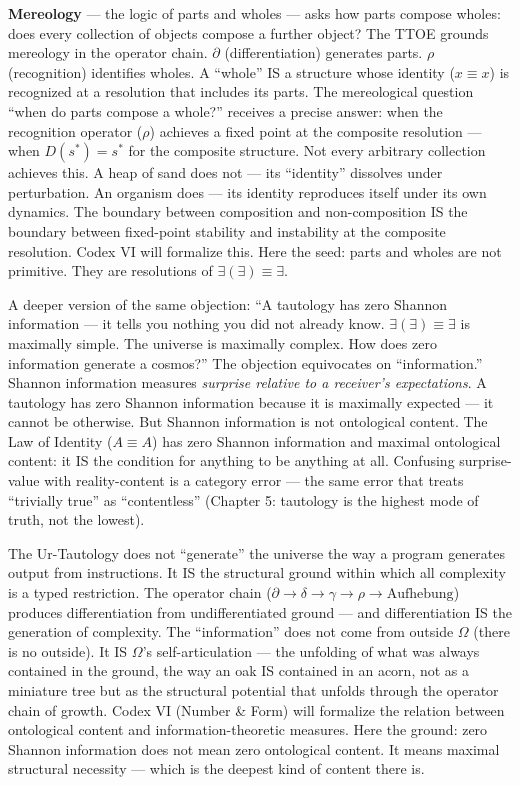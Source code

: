 \documentclass[10pt, openany, oneside]{book}
\begin{document}
\textbf{Mereology} --- the logic of parts and wholes --- asks how parts compose wholes: does every collection of objects compose a further object? The TTOE grounds mereology in the operator chain. $\partial$ (differentiation) generates parts. $\rho$ (recognition) identifies wholes. A ``whole'' IS a structure whose identity ($x \equiv x$) is recognized at a resolution that includes its parts. The mereological question ``when do parts compose a whole?'' receives a precise answer: when the recognition operator ($\rho$) achieves a fixed point at the composite resolution --- when $D(s^*) = s^*$ for the composite structure. Not every arbitrary collection achieves this. A heap of sand does not --- its ``identity'' dissolves under perturbation. An organism does --- its identity reproduces itself under its own dynamics. The boundary between composition and non-composition IS the boundary between fixed-point stability and instability at the composite resolution. Codex VI will formalize this. Here the seed: parts and wholes are not primitive. They are resolutions of $\exists(\exists) \equiv \exists$.

A deeper version of the same objection: ``A tautology has zero Shannon information --- it tells you nothing you did not already know. $\exists(\exists) \equiv \exists$ is maximally simple. The universe is maximally complex. How does zero information generate a cosmos?'' The objection equivocates on ``information.'' Shannon information measures \textit{surprise relative to a receiver's expectations}. A tautology has zero Shannon information because it is maximally expected --- it cannot be otherwise. But Shannon information is not ontological content. The Law of Identity ($A \equiv A$) has zero Shannon information and maximal ontological content: it IS the condition for anything to be anything at all. Confusing surprise-value with reality-content is a category error --- the same error that treats ``trivially true'' as ``contentless'' (Chapter 5: tautology is the highest mode of truth, not the lowest).

The Ur-Tautology does not ``generate'' the universe the way a program generates output from instructions. It IS the structural ground within which all complexity is a typed restriction. The operator chain ($\partial \to \delta \to \gamma \to \rho \to \text{Aufhebung}$) produces differentiation from undifferentiated ground --- and differentiation IS the generation of complexity. The ``information'' does not come from outside $\Omega$ (there is no outside). It IS $\Omega$'s self-articulation --- the unfolding of what was always contained in the ground, the way an oak IS contained in an acorn, not as a miniature tree but as the structural potential that unfolds through the operator chain of growth. Codex VI (Number \& Form) will formalize the relation between ontological content and information-theoretic measures. Here the ground: zero Shannon information does not mean zero ontological content. It means maximal structural necessity --- which is the deepest kind of content there is.
\end{document}
